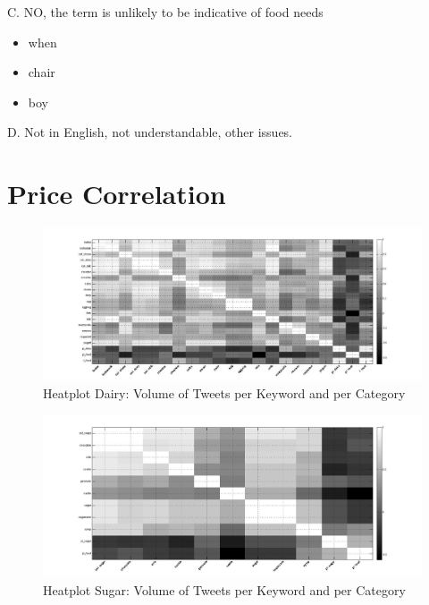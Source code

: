 C. NO, the term is unlikely to be indicative of food needs 
\begin{itemize}
  \item when
  \item chair
  \item boy
\end{itemize}

D. Not in English, not understandable, other issues.

\chapter{Price Correlation}


\begin{figure}[H]
        \centering
         \includegraphics[width=1\textwidth ]{img/anal/dairy_test}
              
        \caption{Heatplot Dairy: Volume of Tweets per Keyword and per Category}
        \label{fig:distribution}
\end{figure}
 

\begin{figure}[H]
        \centering
         \includegraphics[width=1\textwidth ]{img/anal/sugar_black}
              
        \caption{Heatplot Sugar: Volume of Tweets per Keyword and per Category}
        \label{fig:sugar_heat}
\end{figure}

